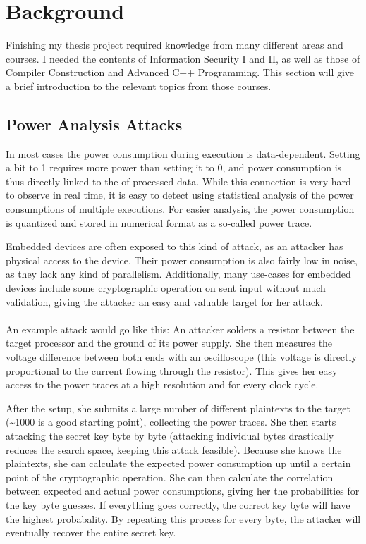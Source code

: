 \section{Background}
\label{background}
Finishing my thesis project required knowledge from many different areas and courses.
I needed the contents of Information Security I and II, as well as those of Compiler Construction and Advanced C++ Programming.
This section will give a brief introduction to the relevant topics from those courses.

\subsection{Power Analysis Attacks}
In most cases the power consumption during execution is data-dependent.
Setting a bit to 1 requires more power than setting it to 0, and power consumption is thus directly linked to the \hammingw{} of processed data.
While this connection is very hard to observe in real time, it is easy to detect using statistical analysis of the power consumptions of multiple executions.
For easier analysis, the power consumption is quantized and stored in numerical format as a so-called power trace.

Embedded devices are often exposed to this kind of attack, as an attacker has physical access to the device.
Their power consumption is also fairly low in noise, as they lack any kind of parallelism.
Additionally, many use-cases for embedded devices include some cryptographic operation on sent input without much validation, giving the attacker an easy and valuable target for her attack.
\\
\\
An example attack would go like this:
An attacker solders a resistor between the target processor and the ground of its power supply.
She then measures the voltage difference between both ends with an oscilloscope (this voltage is directly proportional to the current flowing through the resistor).
This gives her easy access to the power traces at a high resolution and for every clock cycle.

After the setup, she submits a large number of different plaintexts to the target (\textasciitilde 1000 is a good starting point), collecting the power traces.
She then starts attacking the secret key byte by byte (attacking individual bytes drastically reduces the search space, keeping this attack feasible).
Because she knows the plaintexts, she can calculate the expected power consumption up until a certain point of the cryptographic operation.
She can then calculate the correlation between expected and actual power consumptions, giving her the probabilities for the key byte guesses.
If everything goes correctly, the correct key byte will have the highest probabality.
By repeating this process for every byte, the attacker will eventually recover the entire secret key.

